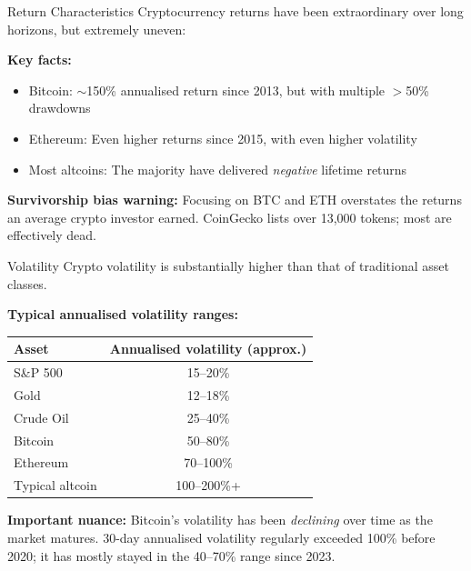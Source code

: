\documentclass[10pt]{beamer}
\begin{document}
\begin{frame}{Return Characteristics}
  Cryptocurrency returns have been extraordinary over long horizons, but extremely uneven:
  
  \vspace{0.5em}
  \textbf{Key facts:}
  \begin{itemize}
    \item Bitcoin: $\sim$150\% annualised return since 2013, but with multiple $>$50\% drawdowns
    \item Ethereum: Even higher returns since 2015, with even higher volatility
    \item Most altcoins: The majority have delivered \textit{negative} lifetime returns
  \end{itemize}
  
  \vspace{0.5em}
  \textbf{Survivorship bias warning:} Focusing on BTC and ETH overstates the returns an average crypto investor earned. CoinGecko lists over 13,000 tokens; most are effectively dead.
  
\end{frame}


\begin{frame}{Volatility}
  Crypto volatility is substantially higher than that of traditional asset classes.
  
  \vspace{0.5em}
  \textbf{Typical annualised volatility ranges:}
  \begin{center}
    \small
    \begin{tabular}{lc}
      \toprule
      \textbf{Asset} & \textbf{Annualised volatility (approx.)} \\
      \midrule
      S\&P 500 & 15--20\% \\
      Gold & 12--18\% \\
      Crude Oil & 25--40\% \\
      Bitcoin & 50--80\% \\
      Ethereum & 70--100\% \\
      Typical altcoin & 100--200\%+ \\
      \bottomrule
    \end{tabular}
  \end{center}
  
  \vspace{0.5em}
  \textbf{Important nuance:} Bitcoin's volatility has been \textit{declining} over time as the market matures. 30-day annualised volatility regularly exceeded 100\% before 2020; it has mostly stayed in the 40--70\% range since 2023.
  
\end{frame}
\end{document}
